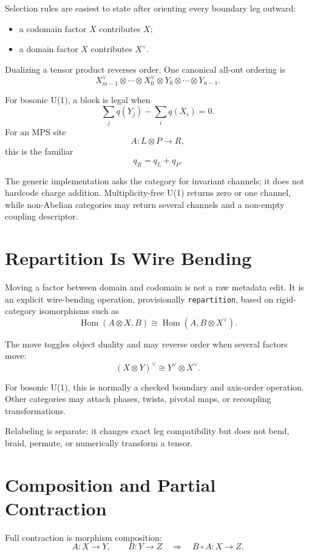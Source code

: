 \documentclass[11pt]{article}
\newcommand{\Hom}{\operatorname{Hom}}
\newcommand{\dual}[1]{#1^{\vee}}
\begin{document}
Selection rules are easiest to state after orienting every boundary
leg outward:

\begin{itemize}[nosep]
  \item a codomain factor \(X\) contributes \(X\);
  \item a domain factor \(X\) contributes \(\dual{X}\).
\end{itemize}

Dualizing a tensor product reverses order.  One canonical all-out
ordering is
\[
  \dual{X}_{m-1}\otimes\cdots\otimes\dual{X}_0
  \otimes Y_0\otimes\cdots\otimes Y_{n-1}.
\]

For bosonic U(1), a block is legal when
\[
  \sum_j q(Y_j)-\sum_i q(X_i)=0.
\]
For an MPS site
\[
  A:L\otimes P\longrightarrow R,
\]
this is the familiar
\[
  q_R=q_L+q_P.
\]

The generic implementation asks the category for invariant channels;
it does not hardcode charge addition.  Multiplicity-free U(1) returns
zero or one channel, while non-Abelian categories may return several
channels and a non-empty coupling descriptor.

\section{Repartition Is Wire Bending}

Moving a factor between domain and codomain is not a raw metadata edit.
It is an explicit wire-bending operation, provisionally
\texttt{repartition}, based on rigid-category isomorphisms such as
\[
  \Hom(A\otimes X,B)
    \cong
  \Hom(A,B\otimes\dual{X}).
\]

The move toggles object duality and may reverse order when several
factors move:
\[
  \dual{(X\otimes Y)}
    \cong
  \dual{Y}\otimes\dual{X}.
\]

For bosonic U(1), this is normally a checked boundary and axis-order
operation.  Other categories may attach phases, twists, pivotal maps,
or recoupling transformations.

Relabeling is separate: it changes exact leg compatibility but does
not bend, braid, permute, or numerically transform a tensor.

\section{Composition and Partial Contraction}

Full contraction is morphism composition:
\[
  A:X\longrightarrow Y,\qquad
  B:Y\longrightarrow Z
  \quad\Rightarrow\quad
  B\circ A:X\longrightarrow Z.
\]
\end{document}
